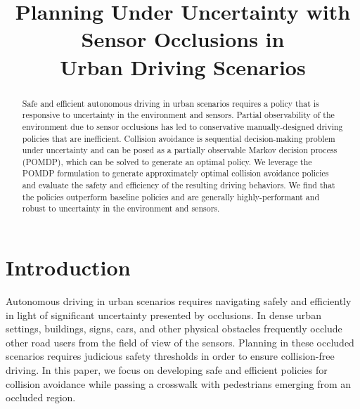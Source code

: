 \documentclass[conference]{IEEEtran}
\begin{document}
\title{\LARGE \textbf{Planning Under Uncertainty with Sensor Occlusions in \\ Urban Driving Scenarios} %
}


\author{
} %


\maketitle

\begin{abstract}
    Safe and efficient autonomous driving in urban scenarios requires a policy that is responsive to uncertainty in the environment and sensors. Partial observability of the environment due to sensor occlusions has led to conservative manually-designed driving policies that are inefficient. Collision avoidance is sequential decision-making problem under uncertainty and can be posed as a partially observable Markov decision process (POMDP), which can be solved to generate an optimal policy. We leverage the POMDP formulation to generate approximately optimal collision avoidance policies and evaluate the safety and efficiency of the resulting driving behaviors. We find that the policies outperform baseline policies and are generally highly-performant and robust to uncertainty in the environment and sensors.
\end{abstract}


\section{Introduction}
\label{sec:introduction}

Autonomous driving in urban scenarios requires navigating safely and efficiently in light of significant uncertainty presented by occlusions. In dense urban settings, buildings, signs, cars, and other physical obstacles frequently occlude other road users from the field of view of the sensors. Planning in these occluded scenarios requires judicious safety thresholds in order to ensure collision-free driving. In this paper, we focus on developing safe and efficient policies for collision avoidance while passing a crosswalk with pedestrians emerging from an occluded region.
\end{document}
